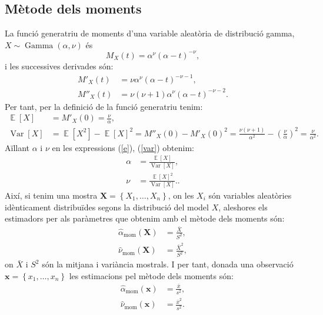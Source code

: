 \documentclass[12pt, catalan]{article}
\numberwithin{table}{section}
\numberwithin{figure}{section}
\numberwithin{equation}{section}
\DeclareMathOperator{\DGamma}{Gamma}
\DeclareMathOperator{\E}{\mathbb{E}}
\DeclareMathOperator{\Var}{Var}
\begin{document}
\subsection{Mètode dels moments}
La funció generatriu de moments d'una variable aleatòria de distribució gamma, \( X \sim \DGamma(\alpha, \nu) \) és
\begin{equation*}
	M_X(t) = \alpha^\nu (\alpha - t)^{-\nu },
\end{equation*}
i les successives derivades són:
\begin{align*}
	M'_X(t) &= \nu \alpha^\nu (\alpha - t)^{-\nu - 1}, \\
	M''_X(t) &= \nu(\nu + 1) \alpha^\nu (\alpha - t)^{-\nu - 2}. 
\end{align*}
Per tant, per la definició de la funció generatriu tenim:
\begin{align} 
		\E[X] &= M'_X(0) = \frac{\nu}{\alpha}\label{e}, \\
		\Var[X] &= \E[X^2] - \E[X]^2 = M''_X(0) - M'_X(0)^2 = \frac{\nu(\nu + 1)}{\alpha^2} - \left( \frac{\nu}{\alpha} \right)^2 = \frac{\nu}{\alpha^2}. \label{var}
\end{align}
Aïllant $\alpha$ i $\nu$ en les expressions (\ref{e}), (\ref{var})  obtenim:
\begin{align} 
		\alpha &= \frac{\E[X]}{\Var[X]}\label{alpha1},\\
		\nu &= \frac{\E[X]^2}{\Var[X]}. \label{nu1}.
\end{align}
Així, si tenim una mostra $\mathbf{X} = \left\{X_1, \dots, X_n\right\}$, on les $X_i$ són variables aleatòries idènticament distribuïdes segons la distribució del model $X$, aleshores els estimadors per als paràmetres que obtenim amb el mètode dels moments són:
\begin{align*}
	\hat{\alpha}_\text{mom}(\mathbf{X}) &= \frac{\bar{X}}{S^2}, \\
	\hat{\nu}_\text{mom}(\mathbf{X}) &= \frac{\bar{X}^2}{S^2}, 
\end{align*}
on \( \bar{X} \) i \( S^2 \) són la mitjana i variància mostrals. I per tant, donada una observació $\mathbf{x} = \left\{x_1, \dots, x_n\right\}$ les estimacions pel mètode dels moments són: 
\begin{align*}
	\hat{\alpha}_\text{mom}(\mathbf{x}) &= \frac{\bar{x}}{s^2}, \\
	\hat{\nu}_\text{mom}(\mathbf{x}) &= \frac{\bar{x}^2}{s^2}.
\end{align*}
\end{document}
